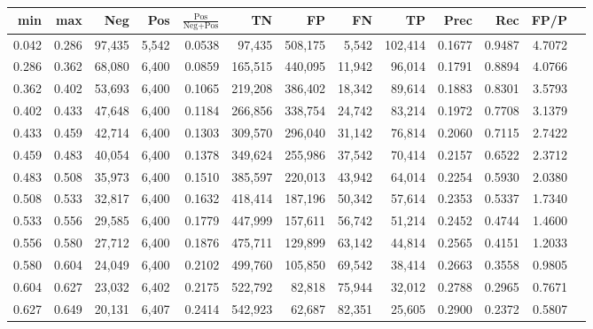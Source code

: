 \begin{tabular}{rrrrrrrrrrrrr}
\toprule
  min &   max &    Neg &   Pos & $\frac{\text{Pos}}{\text{Neg}+\text{Pos}}$ &      TN &      FP &      FN &      TP &   Prec &    Rec &   FP/P \\
\midrule
0.042 & 0.286 & 97,435 & 5,542 &                                     0.0538 &  97,435 & 508,175 &   5,542 & 102,414 & 0.1677 & 0.9487 & 4.7072 \\
0.286 & 0.362 & 68,080 & 6,400 &                                     0.0859 & 165,515 & 440,095 &  11,942 &  96,014 & 0.1791 & 0.8894 & 4.0766 \\
0.362 & 0.402 & 53,693 & 6,400 &                                     0.1065 & 219,208 & 386,402 &  18,342 &  89,614 & 0.1883 & 0.8301 & 3.5793 \\
0.402 & 0.433 & 47,648 & 6,400 &                                     0.1184 & 266,856 & 338,754 &  24,742 &  83,214 & 0.1972 & 0.7708 & 3.1379 \\
0.433 & 0.459 & 42,714 & 6,400 &                                     0.1303 & 309,570 & 296,040 &  31,142 &  76,814 & 0.2060 & 0.7115 & 2.7422 \\
0.459 & 0.483 & 40,054 & 6,400 &                                     0.1378 & 349,624 & 255,986 &  37,542 &  70,414 & 0.2157 & 0.6522 & 2.3712 \\
0.483 & 0.508 & 35,973 & 6,400 &                                     0.1510 & 385,597 & 220,013 &  43,942 &  64,014 & 0.2254 & 0.5930 & 2.0380 \\
0.508 & 0.533 & 32,817 & 6,400 &                                     0.1632 & 418,414 & 187,196 &  50,342 &  57,614 & 0.2353 & 0.5337 & 1.7340 \\
0.533 & 0.556 & 29,585 & 6,400 &                                     0.1779 & 447,999 & 157,611 &  56,742 &  51,214 & 0.2452 & 0.4744 & 1.4600 \\
0.556 & 0.580 & 27,712 & 6,400 &                                     0.1876 & 475,711 & 129,899 &  63,142 &  44,814 & 0.2565 & 0.4151 & 1.2033 \\
0.580 & 0.604 & 24,049 & 6,400 &                                     0.2102 & 499,760 & 105,850 &  69,542 &  38,414 & 0.2663 & 0.3558 & 0.9805 \\
0.604 & 0.627 & 23,032 & 6,402 &                                     0.2175 & 522,792 &  82,818 &  75,944 &  32,012 & 0.2788 & 0.2965 & 0.7671 \\
0.627 & 0.649 & 20,131 & 6,407 &                                     0.2414 & 542,923 &  62,687 &  82,351 &  25,605 & 0.2900 & 0.2372 & 0.5807 \\

\end{tabular}
